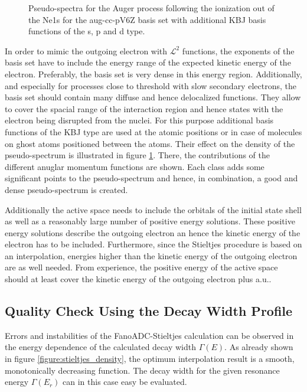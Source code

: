 \begin{figure}[ht]
  \centering
  
  \caption{Pseudo-spectra for the Auger process following the ionization
           out of the Ne1s for the aug-cc-pV6Z basis set with additional
           \ac{KBJ} basis functions of the s, p and d type.}
  \label{figure:bases_jungen}
\end{figure}

In order to mimic the outgoing electron with $\mathcal{L}^2$ functions, the
exponents of the basis set have to include the energy range of the expected
kinetic energy of the electron. Preferably, the basis set is very dense in
this energy region. Additionally, and especially for processes close to threshold
with slow
secondary electrons, the basis set should contain many diffuse and hence
delocalized functions. They allow to cover the spacial range of the interaction
region and hence states with the electron being disrupted from the nuclei.
For this purpose additional basis functions of the \ac{KBJ}\cite{Kaufmann89}
type are used at the atomic positions or in case of molecules on ghost atoms
positioned between the atoms. Their effect on the density of the pseudo-spectrum
is illustrated in figure \ref{figure:bases_jungen}. There, the contributions of the
different anuglar momentum functions are shown. Each class adds some significant
points to the pseudo-spectrum and hence, in combination, a good and dense
pseudo-spectrum is created.

Additionally the active space needs to include the orbitals of the initial state
shell as well as a reasonably large number of positive energy solutions. These
positive energy solutions describe the outgoing electron an hence the kinetic energy
of the electron has to be included. Furthermore, since the Stieltjes procedure is
based on an interpolation, energies higher than the kinetic energy of the outgoing
electron are as well needed. From experience, the positive energy of the active
space should at least cover the kinetic energy of the outgoing electron plus
\unit[10]{a.u.}.



\subsection{Quality Check Using the Decay Width Profile}
Errors and instabilities of the FanoADC-Stieltjes calculation can be observed
in the energy dependence of the calculated decay width $\Gamma(E)$.
As already shown in figure \ref{figure:stieltjes_density}, the optimum
interpolation result is a smooth, monotonically decreasing function.
The decay width for the given resonance energy $\Gamma(E_r)$ can in this case easy be
evaluated.

